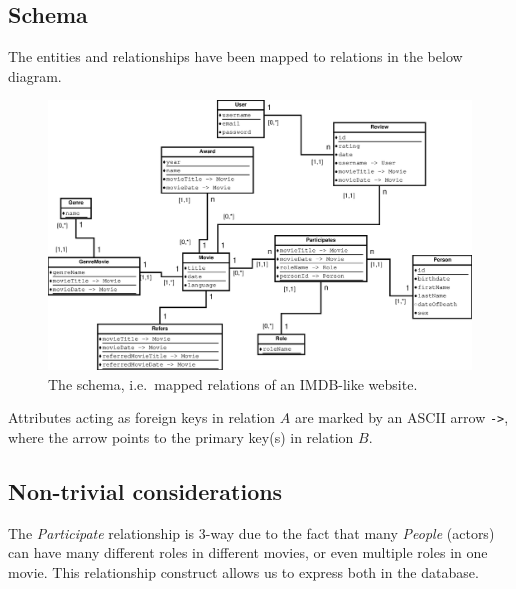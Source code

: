 \subsection{Schema}
The entities and relationships have been mapped to relations in the below diagram.
\begin{figure}[H]
  \centering
  \includegraphics[width=\linewidth]{2-17.02.14/DatabaseSchema.eps}
  \caption{The schema, i.e.\ mapped relations of an IMDB-like website.}\label{fig:schema}
\end{figure}
Attributes acting as foreign keys in relation $A$ are marked by an ASCII arrow \texttt{->}, where the arrow points to the primary key(s) in relation $B$.

\subsection{Non-trivial considerations}
The \emph{Participate} relationship is 3-way due to the fact that many \emph{People} (actors) can have many different roles in different movies, or even multiple roles in one movie. This relationship construct allows us to express both in the database.


